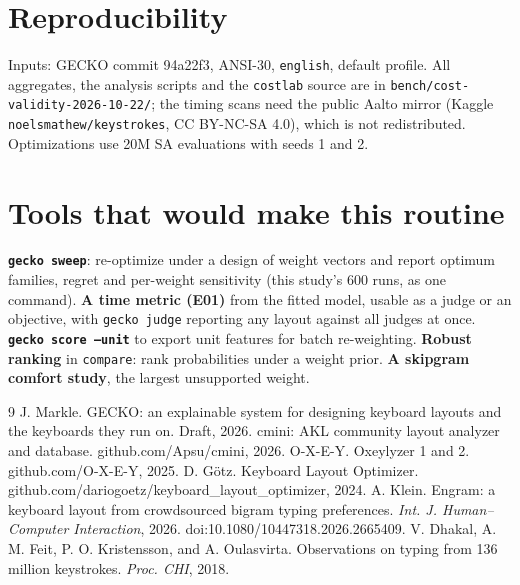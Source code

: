 \documentclass{gecko-paper}
\begin{document}
\begin{paperbody}
\section{Reproducibility}
Inputs: GECKO commit 94a22f3, ANSI-30, \texttt{english}, default profile. All aggregates, the analysis scripts and the \texttt{costlab} source are in \texttt{bench/cost-validity-2026-10-22/}; the timing scans need the public Aalto mirror (Kaggle \texttt{noelsmathew/keystrokes}, CC BY-NC-SA 4.0), which is not redistributed. Optimizations use 20M SA evaluations with seeds 1 and 2.

\section{Tools that would make this routine}
\textbf{\texttt{gecko sweep}}: re-optimize under a design of weight vectors and report optimum families, regret and per-weight sensitivity (this study's 600 runs, as one command). \textbf{A time metric (E01)} from the fitted model, usable as a judge or an objective, with \texttt{gecko judge} reporting any layout against all judges at once. \textbf{\texttt{gecko score --unit}} to export unit features for batch re-weighting. \textbf{Robust ranking} in \texttt{compare}: rank probabilities under a weight prior. \textbf{A skipgram comfort study}, the largest unsupported weight.

\renewcommand{\refname}{References}
\begin{thebibliography}{9}
\paperbibstyle
{} J. Markle. GECKO: an explainable system for designing keyboard layouts and the keyboards they run on. Draft, 2026.
 cmini: AKL community layout analyzer and database. github.com/Apsu/cmini, 2026.
 O-X-E-Y. Oxeylyzer 1 and 2. github.com/O-X-E-Y, 2025.
 D. G\"otz. Keyboard Layout Optimizer. github.com/dariogoetz/keyboard\_layout\_optimizer, 2024.
 A. Klein. Engram: a keyboard layout from crowdsourced bigram typing preferences. \textit{Int. J. Human–Computer Interaction}, 2026. doi:10.1080/10447318.2026.2665409.
 V. Dhakal, A. M. Feit, P. O. Kristensson, and A. Oulasvirta. Observations on typing from 136 million keystrokes. \textit{Proc. CHI}, 2018.
\end{thebibliography}
\end{paperbody}
\end{document}
